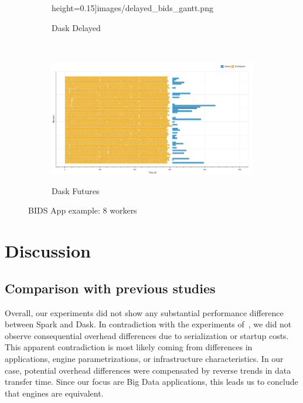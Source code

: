 \documentclass[conference]{IEEEtran}
\begin{document}
\begin{figure}[!htb]
\begin{subfigure}[b]{\columnwidth}
{        height=0.15\textheight]{images/delayed_bids_gantt.png}}
        \caption{Dask Delayed}\label{fig:bids_dask_delayed_gantt}
    \end{subfigure}
    \\
    \begin{subfigure}[b]{\columnwidth}
        \href{https://zenodo.org/record/3354434/files/dask-futures-bids-baseline.html?download=1}{
        \includegraphics[clip,width=\columnwidth,
        height=0.15\textheight]{images/futures_bids_gantt.png}}
        \caption{Dask Futures}\label{fig:bids_dask_futures_gantt}
    \end{subfigure}
    \caption{BIDS App example: 8 workers}\label{fig:bids_gantt}
\end{figure}



\section{Discussion}


\subsection{Comparison with previous studies}

Overall, our experiments did not show any substantial performance
difference between Spark and Dask. In contradiction with the experiments
of~\cite{Mehta:17}, we did not observe consequential overhead differences
due to serialization or startup costs. This apparent contradiction is most
likely coming from differences in applications, engine parametrizations, or
infrastructure characteristics. In our case, potential overhead differences were
compensated by reverse trends in data transfer time. Since our focus are
Big Data applications, this leads us to conclude that engines are
equivalent.
\end{document}
